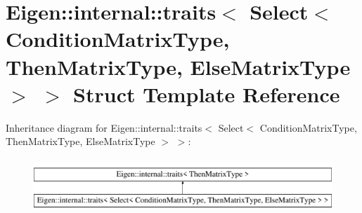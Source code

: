 \hypertarget{struct_eigen_1_1internal_1_1traits_3_01_select_3_01_condition_matrix_type_00_01_then_matrix_type4a832542e824e444643efa2ac02419b2}{}\section{Eigen\+::internal\+::traits$<$ Select$<$ Condition\+Matrix\+Type, Then\+Matrix\+Type, Else\+Matrix\+Type $>$ $>$ Struct Template Reference}
\label{struct_eigen_1_1internal_1_1traits_3_01_select_3_01_condition_matrix_type_00_01_then_matrix_type4a832542e824e444643efa2ac02419b2}
Inheritance diagram for Eigen\+::internal\+::traits$<$ Select$<$ Condition\+Matrix\+Type, Then\+Matrix\+Type, Else\+Matrix\+Type $>$ $>$\+:\begin{figure}[H]
\begin{center}
\leavevmode
\includegraphics[height=2.000000cm]{struct_eigen_1_1internal_1_1traits_3_01_select_3_01_condition_matrix_type_00_01_then_matrix_type4a832542e824e444643efa2ac02419b2}
\end{center}
\end{figure}
